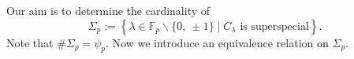 \documentclass[10pt,a4paper]{amsart}
\theoremstyle{plain}
\newtheorem*{thm*}{Theorem}
\newcommand{\lm}{\lambda}
\newcommand{\fp}{\mathbb{F}_p}
\begin{document}
\label{theorema}
\thmA*






Our aim is to determine the cardinality of
\[
{\Sigma}_p:=\left\{ \lm \in \fp \smallsetminus\{0,\ \pm1 \} \mid  C_{\lm} \text{ is superspecial} \right\}.
\]
Note that $\# {\Sigma}_p={\psi}_{p}$.
Now we introduce an equivalence relation \textcolor{black}{on} ${\Sigma}_p$.
\end{document}
